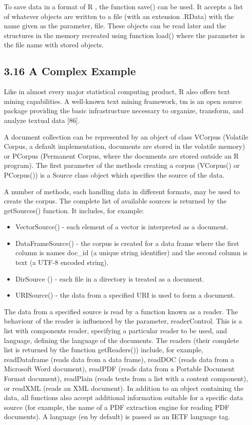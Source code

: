 \documentclass[10pt]{book}
\begin{document}
To save data in a format of R , the function save() can be used. It accepts a list of whatever objects are written to a file (with an extension .RData) with the name given as the parameter, file. These objects can be read later and the structures in the memory recreated using function load() where the parameter is the file name with stored objects.

\subsection*{3.16 A Complex Example}
Like in almost every major statistical computing product, R also offers text mining capabilities. A well-known text mining framework, tm is an open source package providing the basic infrastructure necessary to organize, transform, and analyze textual data [86].

A document collection can be represented by an object of class VCorpus (Volatile Corpus, a default implementation, documents are stored in the volatile memory) or PCorpus (Permanent Corpus, where the documents are stored outside an R program). The first parameter of the methods creating a corpus (VCorpus() or PCorpus()) is a Source class object which specifies the source of the data.

A number of methods, each handling data in different formats, may be used to create the corpus. The complete list of available sources is returned by the getSources() function. It includes, for example:

\begin{itemize}
  \item VectorSource() - each element of a vector is interpreted as a document.
  \item DataFrameSource() - the corpus is created for a data frame where the first column is names doc\_id (a unique string identifier) and the second column is text (a UTF-8 encoded string).
  \item DirSource () - each file in a directory is treated as a document.
  \item URISource() - the data from a specified URI is used to form a document.
\end{itemize}

The data from a specified source is read by a function known as a reader. The behaviour of the reader is influenced by the parameter, readerControl. This is a list with components reader, specifying a particular reader to be used, and language, defining the language of the documents. The readers (their complete list is returned by the function getReaders()) include, for example, readDataframe (reads data from a data frame), readDOC (reads data from a Microsoft Word document), readPDF (reads data from a Portable Document Format document), readPlain (reads texts from a list with a content component), or readXML (reads an XML document). In addition to an object containing the data, all functions also accept additional information suitable for a specific data source (for example, the name of a PDF extraction engine for reading PDF documents). A language (en by default) is passed as an IETF language tag.
\end{document}
